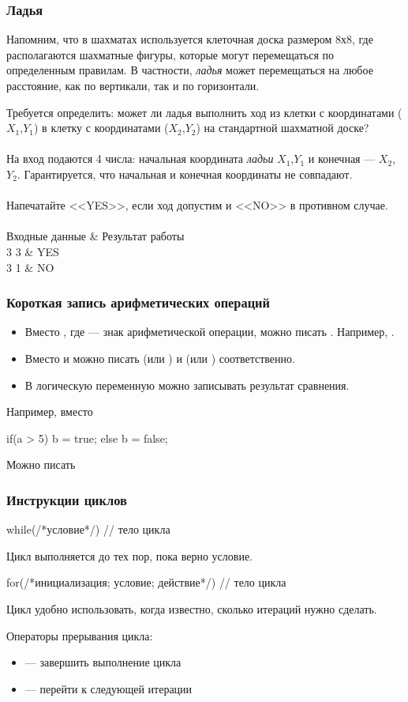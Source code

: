 \documentclass[PDF,10pt,usenames,dvipsnames,t,fragile]{beamer}
\newcommand{\inp}{\vspace{4pt}\\ \vspace{4pt}{\bf Входные данные} \\} %
\newcommand{\out}{\vspace{4pt}\\ \vspace{4pt}{\bf Результат работы} \\} %
\newcommand{\tb}{\\ \hline} %
\newenvironment{ex}{\vspace{4pt}\\ \vspace{4pt}{\bf Пример} \\
\tabularx{\textwidth}{|>{\tt}X|>{\tt}X|}
\hline \sf Входные данные & \sf Результат работы \tb}{\endtabularx}
\begin{document}
\begin{frame}
	\frametitle{Ладья}
	Напомним, что в шахматах используется клеточная доска размером 8х8, где
	располагаются шахматные фигуры, которые могут перемещаться по определенным
	правилам. В частности, {\it ладья} может перемещаться на любое расстояние, как по
	вертикали, так и по горизонтали.

	Требуется определить: может ли ладья выполнить ход из клетки с координатами
	($X_1$,$Y_1$) в клетку с координатами ($X_2$,$Y_2$) на стандартной шахматной доске? 
	\inp
	На вход подаются 4 числа: начальная координата {\it ладьи} $X_1$,$Y_1$ и конечная
	--- $X_2$,$Y_2$. Гарантируется, что начальная и конечная координаты не совпадают.
	\out
	Напечатайте <<YES>>, если ход допустим и <<NO>> в противном случае. 
	\begin{ex}
		4 3  3 & YES \tb
		4 3  1 & NO \tb
	\end{ex}
\end{frame}

\begin{frame}[fragile]
	\frametitle{Короткая запись арифметических операций}

	\begin{itemize}
		\item Вместо , где  --- знак арифметической операции,
	можно писать . Например, .
		\item Вместо  и  можно писать  (или
	) и  (или ) соответственно.
		\item В логическую переменную можно записывать результат сравнения.
	\end{itemize}
	Например, вместо
	\begin{code}
if(a > 5) b = true;
else b = false;
	\end{code}
	Можно писать \\
\end{frame}

\begin{frame}[fragile]
	\frametitle{Инструкции циклов}
	\begin{code}
while(/*условие*/)
{
	// тело цикла			
}
	\end{code}
	Цикл  выполняется до тех пор, пока верно условие.
	\begin{code}
for(/*инициализация; условие; действие*/)
{
	// тело цикла 		
}
	\end{code}
	Цикл  удобно использовать, когда известно, сколько итераций нужно
	сделать. \newline

	{\large Операторы прерывания цикла:}
	\begin{itemize}
		\item {} --- завершить выполнение цикла
		\item {} --- перейти к следующей итерации
	\end{itemize}
\end{frame}
\end{document}
